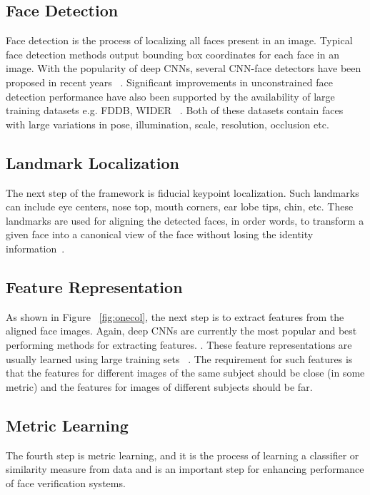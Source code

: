 \documentclass[10pt,twocolumn,letterpaper]{article}
\begin{document}
\subsection{Face Detection}

Face detection is the process of localizing all faces present in an image. Typical face detection methods output bounding box coordinates for each face in an image. With the popularity of deep CNNs, several CNN-face detectors have been proposed in recent years ~\cite{chen2016supervised,li2016face}. Significant improvements in unconstrained face detection performance have also been supported by the availability of large training datasets e.g. FDDB, WIDER ~\cite{yang2016wider}. Both of these datasets contain faces with large variations in pose, illumination, scale, resolution, occlusion etc.

\subsection{Landmark Localization}

The next step of the framework is fiducial keypoint localization. Such landmarks can include eye centers, nose top, mouth corners, ear lobe tips, chin, etc. These landmarks are used for aligning the detected faces, in order words, to transform a given face into a canonical view of the face without losing the identity information~\cite{bansal2018deep}. 

\subsection{Feature Representation}

As shown in Figure ~\ref{fig:onecol}, the next step is to extract features from the aligned face images. Again, deep CNNs are currently the most popular and best performing methods for extracting features. . These feature representations are usually learned using large training sets ~\cite{wolf2011face}. The requirement for such features is that the features for different images of the same subject should be close (in some metric) and the features for images of different subjects should be far.

\subsection{Metric Learning}

The fourth step is metric learning, and it is the process of learning a classifier or similarity measure from data and is an important step for enhancing performance of face verification systems.



{\small


}
\end{document}
